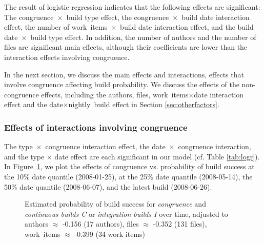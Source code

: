 The result of logistic regression indicates that the following effects are significant: The congruence~$\times$~build type effect, the congruence~$\times$~build date interaction effect, the number of work~items~$\times$~build date interaction effect, and the build date~$\times$~build type effect. In addition, the number of authors and the number of files are significant main effects, although their coefficients are lower than the interaction effects involving congruence.

In the next section, we discuss the main effects and interactions, effects that involve congruence affecting build probability. We discuss the effects of the non-congruence effects, including the authors, files, work~items$\times$date interaction effect and the date$\times$nightly~build effect in Section \ref{sec:otherfactors}.

\subsubsection{Effects of interactions involving congruence}
\label{sec:congruenceinteractions}
The type~$\times$~congruence interaction effect, the date~$\times$~congruence interaction, and the type $\times$ date effect are each significant in our model (cf. Table \ref{tab:logr}). In Figure~\ref{fig:unweighted_congruence_typeci_age}, we plot the effects of congruence vs. probability of build success at the 10\% date quantile (2008-01-25), at the 25\% date quantile (2008-05-14), the 50\% date quantile (2008-06-07), and the latest build (2008-06-26).


\begin{figure}[t!]
\centering
  
  
	\caption{Estimated probability of build success for \emph{congruence} and \emph{continuous builds C} or \emph{integration builds I}  over time, adjusted to authors $\approx$ -0.156 (17 authors), files $\approx$ -0.352 (131 files), work~items $\approx$ -0.399 (34 work items)}
	\label{fig:unweighted_congruence_typeci_age}
\end{figure}


